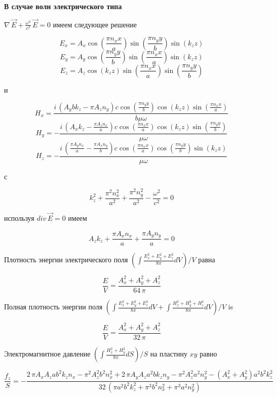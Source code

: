 \documentclass[11pt]{article}
\begin{document}
    \textbf{В случае волн электрического типа}

\(\nabla\,\vec{E} + \frac{\omega^2}{c^2}\,\vec{E} = 0\) имеем следующее
решение

\[E_{x} = A_{x} \cos\left(\frac{\pi n_{x} x}{a}\right) \sin\left(\frac{\pi n_{y} y}{b}\right) \sin\left(k_{z} z\right)\]
\[E_{y} = A_{y} \cos\left(\frac{\pi n_{y} y}{b}\right) \sin\left(\frac{\pi n_{x} x}{a}\right) \sin\left(k_{z} z\right)\]
\[E_{z} = A_{z} \cos\left(k_{z} z\right) \sin\left(\frac{\pi n_{x} x}{a}\right) \sin\left(\frac{\pi n_{y} y}{b}\right)\]

и

\[H_{x} = \frac{i \, {\left(A_{y} b k_{z} - \pi A_{z} n_{y}\right)} c \cos\left(\frac{\pi n_{y} y}{b}\right) \cos\left(k_{z} z\right) \sin\left(\frac{\pi n_{x} x}{a}\right)}{b \mu \omega}\]
\[H_{y} = -\frac{i \, {\left(A_{x} k_{z} - \frac{\pi A_{z} n_{x}}{a}\right)} c \cos\left(\frac{\pi n_{x} x}{a}\right) \cos\left(k_{z} z\right) \sin\left(\frac{\pi n_{y} y}{b}\right)}{\mu \omega}\]
\[H_{z} = -\frac{i \, {\left(\frac{\pi A_{y} n_{x}}{a} - \frac{\pi A_{x} n_{y}}{b}\right)} c \cos\left(\frac{\pi n_{x} x}{a}\right) \cos\left(\frac{\pi n_{y} y}{b}\right) \sin\left(k_{z} z\right)}{\mu \omega}\]

с

\[k_{z}^{2} + \frac{\pi^{2} n_{x}^{2}}{a^{2}} + \frac{\pi^{2} n_{y}^{2}}{a^{2}} - \frac{\omega^{2}}{c^{2}} = 0\]

используя \(div\,\vec{E} = 0\) имеем

\[A_{z} k_{z} + \frac{\pi A_{x} n_{x}}{a} + \frac{\pi A_{y} n_{y}}{a} = 0\]

Плотность энергии электрического поля
\(\left(\int \frac{E_x^2+E_y^2+E_z^2}{8 \pi}dV\right)\big/{V}\) равна

\[\frac{E}{V} = \frac{{A_{x}^{2} + A_{y}^{2} + A_{z}^{2}}}{64 \, \pi}\]

    Полная плотность энергии поля
\(\left(\int \frac{E_x^2+E_y^2+E_z^2}{8 \pi}dV + \int \frac{H_x^2+H_y^2+H_z^2}{8 \pi}dV\right)\big/{V}\)
is

    \[\frac{E}{V} = \frac{{A_{x}^{2} + A_{y}^{2} + A_{z}^{2}}}{32 \, \pi}\]

    Электромагнитное давление
\(\left({\int \frac {H_x^2+H_y^2}{8 \pi} dS}\right)\big/{S}\) на
пластину \(xy\) равно

    \[\frac{f_z}{S} = -\frac{2 \, \pi A_{x} A_{z} a b^{2} k_{z} n_{x} - \pi^{2} A_{z}^{2} b^{2} n_{x}^{2} + 2 \, \pi A_{y} A_{z} a^{2} b k_{z} n_{y} - \pi^{2} A_{z}^{2} a^{2} n_{y}^{2} - {\left(A_{x}^{2} + A_{y}^{2}\right)} a^{2} b^{2} k_{z}^{2}}{32 \, {\left(\pi a^{2} b^{2} k_{z}^{2} + \pi^{3} b^{2} n_{x}^{2} + \pi^{3} a^{2} n_{y}^{2}\right)}}\]
\end{document}

